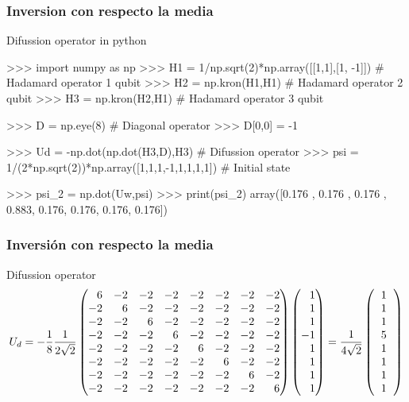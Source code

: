 \begin{frame}[fragile]{}
	\frametitle{Inversion con respecto la media}
	\begin{exampleblock}{Difussion operator in python}
		\vspace*{0.5cm}
		\begin{adjustbox}{max width=0.9\textwidth}
			\begin{python}
>>> import numpy as np
>>> H1 = 1/np.sqrt(2)*np.array([[1,1],[1, -1]]) # Hadamard operator 1 qubit
>>> H2 = np.kron(H1,H1) # Hadamard operator 2 qubit
>>> H3 = np.kron(H2,H1) # Hadamard operator 3 qubit

>>> D = np.eye(8) # Diagonal operator
>>> D[0,0] = -1

>>> Ud = -np.dot(np.dot(H3,D),H3) # Difussion operator
>>> psi = 1/(2*np.sqrt(2))*np.array([1,1,1,-1,1,1,1,1]) # Initial state

>>> psi_2 = np.dot(Uw,psi)
>>> print(psi_2)
array([0.176 , 0.176 , 0.176 , 0.883, 0.176, 0.176, 0.176, 0.176])
			\end{python}
		\end{adjustbox}
	\end{exampleblock}

\end{frame}
\begin{frame}
	\frametitle{Inversión con respecto la media}
	\begin{exampleblock}{Difussion operator}
	\begin{eqnarray}
	U_d = -\frac{1}{8}\frac{1}{2\sqrt{2}}\begin{pmatrix*}[r]
	6 & -2 & -2 & -2 & -2 & -2 & -2 & -2\\
	-2 & 6 & -2 & -2 & -2 & -2 & -2 & -2\\
	-2 & -2 & 6 & -2 & -2 & -2 & -2 & -2\\
	-2 & -2 & -2 & 6 & -2 & -2 & -2 & -2\\
	-2 & -2 & -2 & -2 & 6 & -2 & -2 & -2\\
	-2 & -2 & -2 & -2 & -2 & 6 & -2 & -2\\
	-2 & -2 & -2 & -2 & -2 & -2 & 6 & -2\\
	-2 & -2 & -2 & -2 & -2 & -2 & -2 & 6
	\end{pmatrix*}
		\begin{pmatrix*}[r]
		1\\
		1\\
		1\\
		-1\\
		1\\
		1\\
		1\\
		1
		\end{pmatrix*}=\frac{1}{4\sqrt{2}}
		\left(
		\begin{tabular}{c}
		1\\
		1\\
		1\\
		5\\
		1\\
		1\\
		1\\
		1
		\end{tabular}
		\right)\nonumber
	\end{eqnarray}
	\end{exampleblock}
\end{frame}